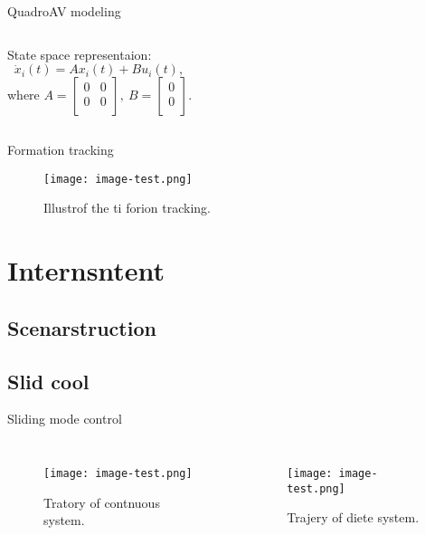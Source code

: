 \documentclass[table,aspectratio=1610]{beamer}%
\begin{document}
\begin{frame}{QuadroAV modeling}
\begin{columns}
		State space representaion:
		{\footnotesize
			\begin{equation} \label{eq:system:continuous}
			\dot{x}_i(t)=Ax_i(t)+Bu_i(t),
			\end{equation}
			{\normalsize where }
			$
			A=
			\begin{bmatrix}
			0  & 0  \\
			0  & 0  \\
			\end{bmatrix}
			, \
			B=
			\begin{bmatrix}
			0 \\
			0 \\
			\end{bmatrix}.
			$
		}
	\end{columns}
\end{frame}

\begin{frame}{Formation tracking}
	\begin{figure}
		\centering
		\texttt{[image: image-test.png]}
		\caption{Illustrof the ti forion tracking.}
	\end{figure}
\end{frame}



\section{Internsntent}

\subsection{Scenarstruction}

\subsection{Slid cool}
\begin{frame}{Sliding mode control}
	\begin{columns}
		\begin{figure}
			\centering
			\texttt{[image: image-test.png]}
			\caption{Tratory of \alert{contnuous} system.}
		\end{figure}
		
		\pause
		\begin{figure}
			\centering
			\texttt{[image: image-test.png]}
			\caption{Trajery of \alert{diete} system.}
		\end{figure}
	\end{columns}
\end{frame}
\end{document}
